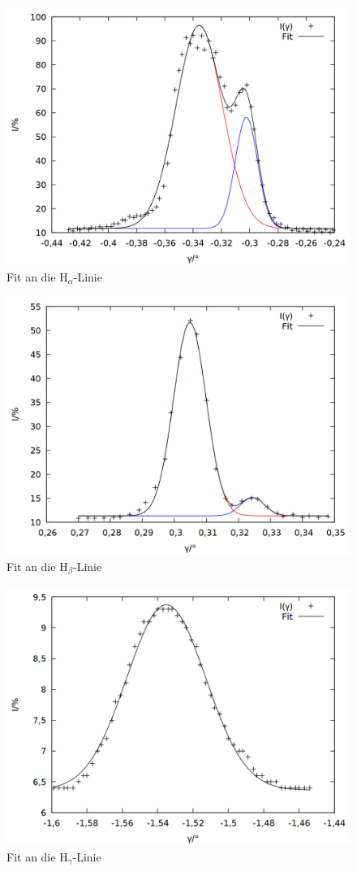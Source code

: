 \begin{figure}[h]
  \centering
  \includegraphics[width=0.75\linewidth]{data/Balmer/out_red.png}
  \caption{Fit an die H$_\alpha$-Linie}
  \label{fig:red}
\end{figure}
\begin{figure}[h]
  \centering
  \includegraphics[width=0.75\linewidth]{data/Balmer/out_lightblue.png}
  \caption{Fit an die H$_\beta$-Linie}
  \label{fig:lightblu}
\end{figure}
\begin{figure}[h]
  \centering
  \includegraphics[width=0.75\linewidth]{data/Balmer/out_blue0.png}
  \caption{Fit an die H$_\gamma$-Linie}
  \label{fig:blue0}
\end{figure}
